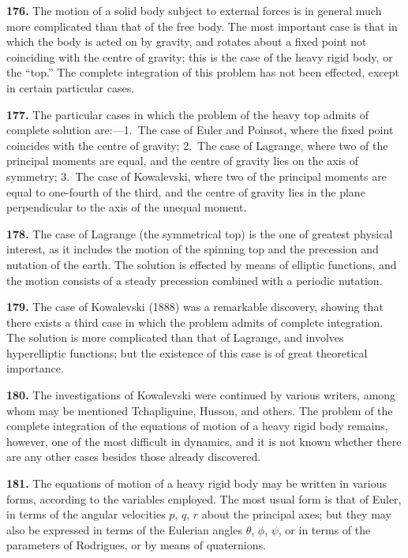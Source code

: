 \documentclass[11pt,a4paper]{book}
\begin{document}
\textbf{176.} The motion of a solid body subject to external forces is in general much more complicated than that of the free body. The most important case is that in which the body is acted on by gravity, and rotates about a fixed point not coinciding with the centre of gravity; this is the case of the heavy rigid body, or the ``top.'' The complete integration of this problem has not been effected, except in certain particular cases.

\textbf{177.} The particular cases in which the problem of the heavy top admits of complete solution are:---1.\ The case of Euler and Poinsot, where the fixed point coincides with the centre of gravity; 2.\ The case of Lagrange, where two of the principal moments are equal, and the centre of gravity lies on the axis of symmetry; 3.\ The case of Kowalevski, where two of the principal moments are equal to one-fourth of the third, and the centre of gravity lies in the plane perpendicular to the axis of the unequal moment.

\textbf{178.} The case of Lagrange (the symmetrical top) is the one of greatest physical interest, as it includes the motion of the spinning top and the precession and nutation of the earth. The solution is effected by means of elliptic functions, and the motion consists of a steady precession combined with a periodic nutation.

\textbf{179.} The case of Kowalevski (1888) was a remarkable discovery, showing that there exists a third case in which the problem admits of complete integration. The solution is more complicated than that of Lagrange, and involves hyperelliptic functions; but the existence of this case is of great theoretical importance.

\textbf{180.} The investigations of Kowalevski were continued by various writers, among whom may be mentioned Tchapliguine, Husson, and others. The problem of the complete integration of the equations of motion of a heavy rigid body remains, however, one of the most difficult in dynamics, and it is not known whether there are any other cases besides those already discovered.

\textbf{181.} The equations of motion of a heavy rigid body may be written in various forms, according to the variables employed. The most usual form is that of Euler, in terms of the angular velocities $p$, $q$, $r$ about the principal axes; but they may also be expressed in terms of the Eulerian angles $\theta$, $\phi$, $\psi$, or in terms of the parameters of Rodrigues, or by means of quaternions.
\end{document}

